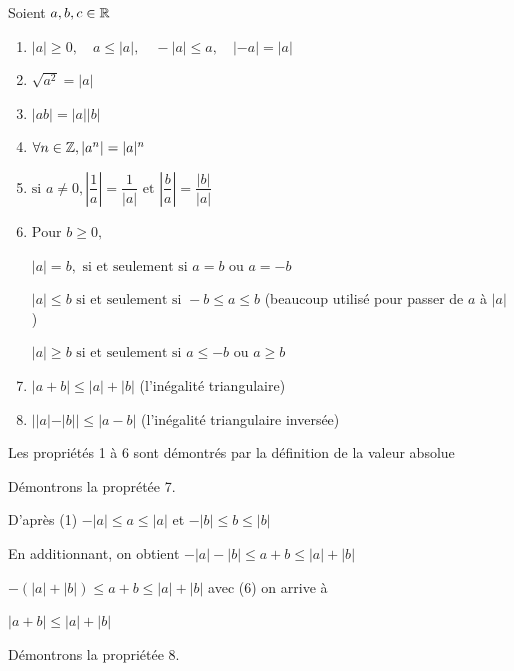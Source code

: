 \documentclass[a4paper, 12pt]{article}
\begin{document}
\noindent
Soient $a, b, c \in \mathbb{R}$

\begin{propriete}{}{}
    \begin{enumerate}
        \item $|a| \geq 0, \quad a \leq |a|, \quad -|a| \leq a, \quad |-a| = |a|$
        \item $\sqrt{a^2} = |a|$
        \item $|ab| = |a||b|$
        \item $\forall n \in \mathbb{Z}, |a^n| = |a|^n$
        \item $\text{si } a \neq 0, |\dfrac{1}{a}|=\dfrac{1}{|a|} \text{ et } |\dfrac{b}{a}| = \dfrac{|b|}{|a|}$
        \item
        $\text{Pour } b \geq 0,$
        
        $|a| = b, \text{ si et seulement si } a = b \text{ ou } a = -b$
        
        $|a| \leq b \text{ si et seulement si } -b \leq a \leq b$ (beaucoup utilisé pour passer de $a$ à $|a|$)
        
        $|a| \geq b \text{ si et seulement si } a \leq -b \text{ ou } a \geq b$
        \item $|a + b| \leq |a| + |b|$ (l'inégalité triangulaire)
        \item $||a| - |b|| \leq |a - b|$ (l'inégalité triangulaire inversée)
    \end{enumerate}
\end{propriete}

Les propriétés 1 à 6 sont démontrés par la définition de la valeur absolue

Démontrons la proprétée 7.

\begin{demonstration}
    D'après (1) \quad
    $-|a| \leq a \leq |a|$ et $-|b| \leq b \leq |b|$
    
    En additionnant, on obtient $-|a|-|b| \leq a + b \leq |a| + |b|$

    $-(|a|+|b|) \leq a + b \leq |a| + |b|$ avec (6) on arrive à

    $|a + b| \leq |a| + |b|$
\end{demonstration}

Démontrons la propriétée 8.
\end{document}
